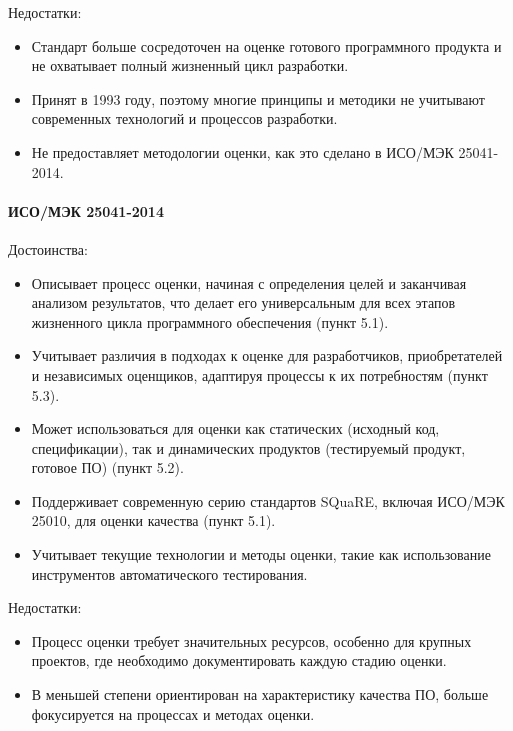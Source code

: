 Недостатки:

\begin{itemize}
	\item Стандарт больше сосредоточен на оценке готового программного продукта
		и не охватывает полный жизненный цикл разработки.
	\item Принят в 1993 году, поэтому многие принципы
		и методики не учитывают современных технологий
		и процессов разработки.
	\item Не предоставляет методологии оценки,
		как это сделано в ИСО/МЭК 25041-2014.
\end{itemize}

\paragraph{ИСО/МЭК 25041-2014}

Достоинства:

\begin{itemize}
	\item Описывает процесс оценки, начиная с определения целей
		и заканчивая анализом результатов, что делает его универсальным
		для всех этапов жизненного цикла программного обеспечения (пункт 5.1).
	\item Учитывает различия в подходах к оценке для разработчиков,
		приобретателей и независимых оценщиков,
		адаптируя процессы к их потребностям (пункт 5.3).
	\item Может использоваться для оценки как статических
		(исходный код, спецификации),
		так и динамических продуктов
		(тестируемый продукт, готовое ПО) (пункт 5.2).
	\item Поддерживает современную серию стандартов SQuaRE,
		включая ИСО/МЭК 25010, для оценки качества (пункт 5.1).
	\item Учитывает текущие технологии и методы оценки,
		такие как использование инструментов автоматического тестирования.
\end{itemize}

Недостатки:

\begin{itemize}
	\item Процесс оценки требует значительных ресурсов,
		особенно для крупных проектов,
		где необходимо документировать каждую стадию оценки.
	\item В меньшей степени ориентирован на характеристику качества ПО,
		больше фокусируется на процессах и методах оценки.
\end{itemize}

